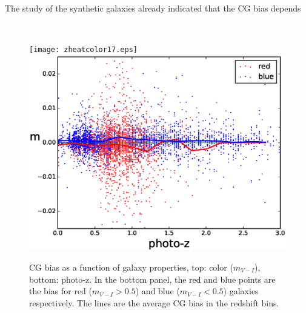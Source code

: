\documentclass[useAMS,usenatbib]{mnras}
\begin{document}
The study of the synthetic galaxies already indicated that the CG bias depends 




\
%
\begin{figure}
\texttt{[image: zheatcolor17.eps]}
\includegraphics[width=\hsize]{zphotoz17.eps}
\caption{CG bias as a function of galaxy properties, top: color
  ($m_{V-I}$), bottom: photo-z. In the bottom panel, the red and blue
  points are the bias for red ($m_{V-I}>0.5$) and blue ($m_{V-I}<0.5$)
  galaxies respectively. The lines are the average CG bias in the
  redshift bins.}
\label{fig:cg2color}
\end{figure}
\end{document}
